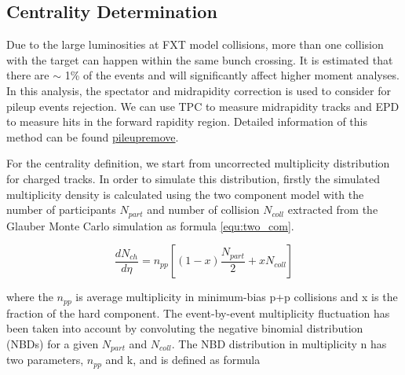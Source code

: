 \subsection{Centrality Determination}

Due to the large luminosities at FXT model collisions, more than one collision with the target can happen within the same bunch crossing. It is estimated that there are $\sim$ 1\% of the events and will significantly affect higher moment analyses. In this analysis, the spectator and midrapidity correction is used to consider for pileup events rejection. We can use TPC to measure midrapidity tracks and EPD to measure hits in the forward rapidity region. Detailed information of this method can be found \href{https://drupal.star.bnl.gov/STAR/system/files/PileupFXT3GeV_BulkCorr.pdf}{pileupremove}.

For the centrality definition, we start from uncorrected multiplicity distribution for charged tracks. In order to simulate this distribution, firstly the simulated multiplicity density is calculated using the two component model \cite{Kharzeev:2000ph} with the number of participants $N_{part}$ and number of collision $N_{coll}$ extracted from the Glauber Monte Carlo simulation as formula \ref{equ:two_com}.

\begin{equation}
    \frac{dN_{ch}}{d\eta} = n_{pp} \left [(1-x)\frac{N_{part}}{2} +xN_{coll}\right]
    \label{equ:two_com}
\end{equation}

where the $n_{pp}$ is average multiplicity in minimum-bias p+p collisions and x is the fraction of the hard component. The event-by-event multiplicity fluctuation has been taken into account by convoluting the negative binomial distribution (NBDs) for a given $N_{part}$ and $N_{coll}$. The NBD distribution in multiplicity n has two parameters, $n_{pp}$ and k, and is defined as formula 

